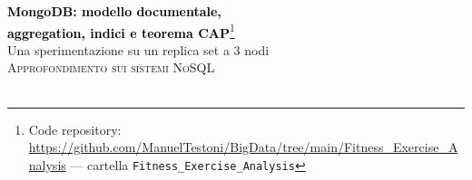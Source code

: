 \begin{titlepage}
    \selectfont 

    \vspace*{3cm}
    
    \centering
    {\Huge \textbf{\textcolor{black}{MongoDB: modello documentale,\\[0.4cm] aggregation, indici e teorema CAP}}}\footnote{Code repository: \url{https://github.com/ManuelTestoni/BigData/tree/main/Fitness_Exercise_Analysis} --- cartella \texttt{Fitness\_Exercise\_Analysis}}\\[0.6cm]
    {\large \textcolor{unimoregrey}{Una sperimentazione su un replica set a 3 nodi}}\\[1.4cm]
    \textsc{\LARGE Approfondimento sui sistemi NoSQL}\\[0.5cm]
    \\[2cm]


\end{titlepage}
